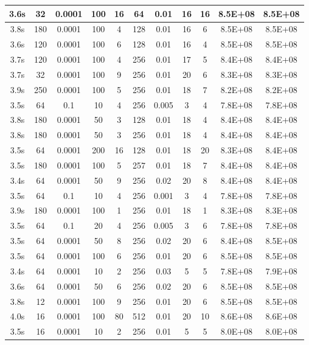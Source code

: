 \begin{longtable}{|c|c|c|c|c|c|c|c|c|c|c|}
3.6s & 32 & 0.0001 & 100 & 16 & 64 & 0.01 & 16 & 16 & 8.5E+08 & 8.5E+08 \\ \hline
3.8s & 180 & 0.0001 & 100 & 4 & 128 & 0.01 & 16 & 6 & 8.5E+08 & 8.5E+08 \\ \hline
3.6s & 120 & 0.0001 & 100 & 6 & 128 & 0.01 & 16 & 4 & 8.5E+08 & 8.5E+08 \\ \hline
3.7s & 120 & 0.0001 & 100 & 4 & 256 & 0.01 & 17 & 5 & 8.4E+08 & 8.4E+08 \\ \hline
3.7s & 32 & 0.0001 & 100 & 9 & 256 & 0.01 & 20 & 6 & 8.3E+08 & 8.3E+08 \\ \hline
3.9s & 250 & 0.0001 & 100 & 5 & 256 & 0.01 & 18 & 7 & 8.2E+08 & 8.2E+08 \\ \hline
3.5s & 64 & 0.1 & 10 & 4 & 256 & 0.005 & 3 & 4 & 7.8E+08 & 7.8E+08 \\ \hline
3.8s & 180 & 0.0001 & 50 & 3 & 128 & 0.01 & 18 & 4 & 8.4E+08 & 8.4E+08 \\ \hline
3.8s & 180 & 0.0001 & 50 & 3 & 256 & 0.01 & 18 & 4 & 8.4E+08 & 8.4E+08 \\ \hline
3.5s & 64 & 0.0001 & 200 & 16 & 128 & 0.01 & 18 & 20 & 8.3E+08 & 8.4E+08 \\ \hline
3.5s & 180 & 0.0001 & 100 & 5 & 257 & 0.01 & 18 & 7 & 8.4E+08 & 8.4E+08 \\ \hline
3.4s & 64 & 0.0001 & 50 & 9 & 256 & 0.02 & 20 & 8 & 8.4E+08 & 8.4E+08 \\ \hline
3.5s & 64 & 0.1 & 10 & 4 & 256 & 0.001 & 3 & 4 & 7.8E+08 & 7.8E+08 \\ \hline
3.9s & 180 & 0.0001 & 100 & 1 & 256 & 0.01 & 18 & 1 & 8.3E+08 & 8.3E+08 \\ \hline
3.5s & 64 & 0.1 & 20 & 4 & 256 & 0.005 & 3 & 6 & 7.8E+08 & 7.8E+08 \\ \hline
3.5s & 64 & 0.0001 & 50 & 8 & 256 & 0.02 & 20 & 6 & 8.4E+08 & 8.5E+08 \\ \hline
3.5s & 64 & 0.0001 & 100 & 6 & 256 & 0.01 & 20 & 6 & 8.5E+08 & 8.5E+08 \\ \hline
3.4s & 64 & 0.0001 & 10 & 2 & 256 & 0.03 & 5 & 5 & 7.8E+08 & 7.9E+08 \\ \hline
3.6s & 64 & 0.0001 & 50 & 6 & 256 & 0.02 & 20 & 6 & 8.5E+08 & 8.5E+08 \\ \hline
3.8s & 12 & 0.0001 & 100 & 9 & 256 & 0.01 & 20 & 6 & 8.5E+08 & 8.5E+08 \\ \hline
4.0s & 16 & 0.0001 & 100 & 80 & 512 & 0.01 & 20 & 10 & 8.6E+08 & 8.6E+08 \\ \hline
3.5s & 16 & 0.0001 & 10 & 2 & 256 & 0.01 & 5 & 5 & 8.0E+08 & 8.0E+08 \\ \hline

\end{longtable}
